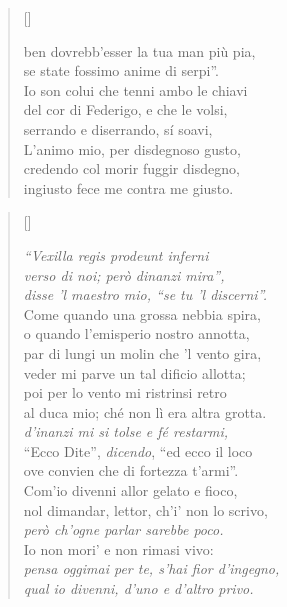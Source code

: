 \documentclass{article}
\begin{document}
\begin{verse}[\versewidth]
\begin{patverse*}
    ben dovrebb'esser la tua man più pia,\\
    se state fossimo anime di serpi''.\\[10pt]
    Io son colui che tenni ambo le chiavi\\
    del cor di Federigo, e che le volsi,\\
    serrando e diserrando, sí soavi,\\[10pt]
    L'animo mio, per disdegnoso gusto,\\
    credendo col morir fuggir disdegno,\\
    ingiusto fece me contra me giusto.
  \end{patverse*}
\end{verse}

\begin{verse}[\versewidth]
  \begin{patverse*}
    \emph{``Vexilla regis prodeunt inferni\\
    verso di noi; però dinanzi mira'',\\
    disse 'l maestro mio, ``se tu 'l discerni''.}\\
    Come quando una grossa nebbia spira,\\
    o quando l'emisperio nostro annotta,\\
    par di lungi un molin che 'l vento gira,\\
    veder mi parve un tal dificio allotta;\\
    poi per lo vento mi ristrinsi retro\\
    al duca mio; ché non lì era altra grotta.\\[10pt]
    \emph{d'inanzi mi si tolse e fé restarmi,}\\
    ``Ecco Dite'', \emph{dicendo}, ``ed ecco il loco\\
    ove convien che di fortezza t'armi''.\\
    Com'io divenni allor gelato e fioco,\\
    nol dimandar, lettor, ch'i' non lo scrivo,\\
    \emph{però ch'ogne parlar sarebbe poco.}\\
    Io non mori' e non rimasi vivo:\\
    \emph{pensa oggimai per te, s'hai fior d'ingegno,\\
    qual io divenni, d'uno e d'altro privo.}\\

\end{patverse*}
\end{verse}
\end{document}

